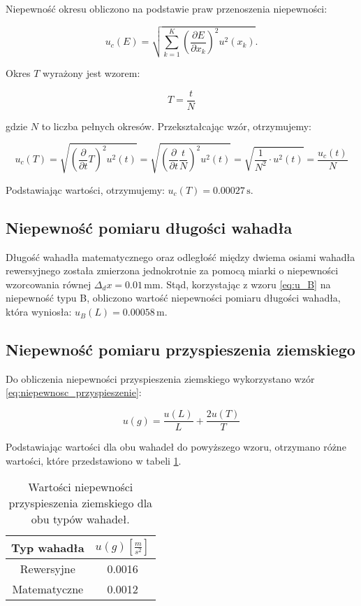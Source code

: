 \documentclass[a4paper,12pt]{article}
\begin{document}
Niepewność okresu obliczono na podstawie praw przenoszenia niepewności:

\begin{equation}
\label{eq:niepewnosc_zlozona}
    u_c(E) = \sqrt{\sum_{k=1}^{K} \left( \frac{\partial E}{\partial x_k} \right)^2 u^2(x_k)}.
\end{equation}

Okres $T$ wyrażony jest wzorem:

\[
T = \frac{t}{N}
\]

gdzie $N$ to liczba pełnych okresów. Przekształcając wzór, otrzymujemy:

\[
u_c(T) = \sqrt{\left(\frac{\partial}{\partial t} T\right)^2 u^2(t)} = \sqrt{\left(\frac{\partial}{\partial t} \frac{t}{N}\right)^2 u^2(t)} = \sqrt{ \frac{1}{N^2} \cdot u^2(t)} = \frac{u_c(t)}{N}
\]

Podstawiając wartości, otrzymujemy: $u_c(T) = 0.00027\,\text{s}$.

\subsection{Niepewność pomiaru długości wahadła}

Długość wahadła matematycznego oraz odległość między dwiema osiami wahadła rewersyjnego została zmierzona jednokrotnie za pomocą miarki o niepewności wzorcowania równej $\Delta_d x = 0.01\,\text{mm}$. Stąd, korzystając z wzoru \ref{eq:u_B} na niepewność typu B, obliczono wartość niepewności pomiaru długości wahadła, która wyniosła: $u_B(L) = 0.00058\,\text{m}$.

\subsection{Niepewność pomiaru przyspieszenia ziemskiego}

Do obliczenia niepewności przyspieszenia ziemskiego wykorzystano wzór \ref{eq:niepewnosc_przyspieszenie}:

\begin{equation}
\label{eq:niepewnosc_przyspieszenie}
u(g) = \frac{u(L)}{L} + \frac{2 u(T)}{T}
\end{equation}

Podstawiając wartości dla obu wahadeł do powyższego wzoru, otrzymano różne wartości, które przedstawiono w tabeli \ref{tab:niepewnosci}.


\begin{table}[H]
    \centering
    \begin{tabular}{|c|c|}
        \hline
        Typ wahadła & $u(g) \left[\frac{m}{s^2}\right]$ \\
        \hline
        Rewersyjne & 0.0016 \\
        \hline
        Matematyczne & 0.0012 \\
        \hline
    \end{tabular}
    \caption{Wartości niepewności przyspieszenia ziemskiego dla obu typów wahadeł.}
    \label{tab:niepewnosci}
\end{table}
\end{document}

